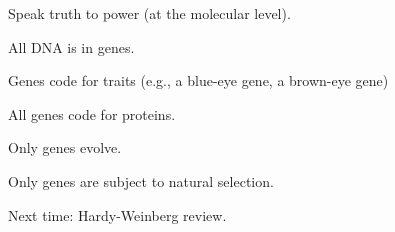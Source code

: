 \documentclass[t]{beamer}
\begin{document}
\begin{frame}{Speak truth to power (at the molecular level).}

\vspace{-\baselineskip}

\hangpara All DNA is in genes. 

\pause

\hangpara Genes code for traits (e.g., a blue-eye gene, a brown-eye gene) 

\pause

\hangpara All genes code for proteins. 

\pause

\hangpara Only genes evolve. 

\pause

\hangpara Only genes are subject to natural selection. 

\end{frame}

\begin{frame}[t]{Next time: Hardy-Weinberg review.}


\end{frame}
\end{document}
